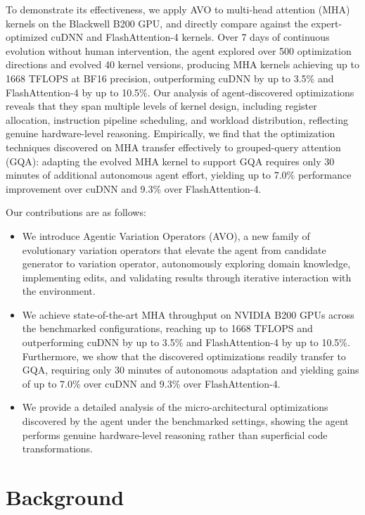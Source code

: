 \documentclass{article}
\begin{document}
To demonstrate its effectiveness, we apply AVO to multi-head attention (MHA) kernels on the Blackwell B200 GPU, and directly compare against the expert-optimized cuDNN and FlashAttention-4 kernels.
Over 7 days of continuous evolution without human intervention, the agent explored over 500 optimization directions and evolved 40 kernel versions, producing MHA kernels achieving up to 1668 TFLOPS at BF16 precision, outperforming cuDNN by up to 3.5\% and FlashAttention-4 by up to 10.5\%.
Our analysis of agent-discovered optimizations reveals that they span multiple levels of kernel design, including register allocation, instruction pipeline scheduling, and workload distribution, reflecting genuine hardware-level reasoning.
Empirically, we find that the optimization techniques discovered on MHA transfer effectively to grouped-query attention (GQA): adapting the evolved MHA kernel to support GQA requires only 30 minutes of additional autonomous agent effort, yielding up to 7.0\% performance improvement over cuDNN and 9.3\% over FlashAttention-4.

Our contributions are as follows:
\begin{itemize}
    \item We introduce Agentic Variation Operators (AVO), a new family of evolutionary variation operators that elevate the agent from candidate generator to variation operator, autonomously exploring domain knowledge, implementing edits, and validating results through iterative interaction with the environment.
    \item We achieve state-of-the-art MHA throughput on NVIDIA B200 GPUs across the benchmarked configurations, reaching up to 1668 TFLOPS and outperforming cuDNN by up to 3.5\% and FlashAttention-4 by up to 10.5\%. Furthermore, we show that the discovered optimizations readily transfer to GQA, requiring only 30 minutes of autonomous adaptation and yielding gains of up to 7.0\% over cuDNN and 9.3\% over FlashAttention-4.
    \item We provide a detailed analysis of the micro-architectural optimizations discovered by the agent under the benchmarked settings, showing the agent performs genuine hardware-level reasoning rather than superficial code transformations.
\end{itemize}

\section{Background}
\label{sec:background}
\end{document}
